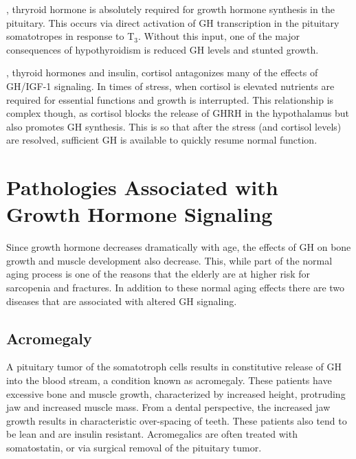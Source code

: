 \documentclass{tufte-handout}
\begin{document}
, thryroid hormone is absolutely required for growth hormone synthesis in the pituitary.  This occurs via direct activation of GH transcription in the pituitary somatotropes in response to T$_3$.  Without this input, one of the major consequences of hypothyroidism is reduced GH levels and stunted growth.

, thyroid hormones and insulin, cortisol antagonizes many of the effects of GH/IGF-1 signaling.  In times of stress, when cortisol is elevated nutrients are required for essential functions and growth is interrupted.  This relationship is complex though, as cortisol blocks the release of GHRH in the hypothalamus but also promotes GH synthesis.  This is so that after the stress (and cortisol levels) are resolved, sufficient GH is available to quickly resume normal function.

\section{Pathologies Associated with Growth Hormone Signaling}

Since growth hormone decreases dramatically with age, the effects of GH on bone growth and muscle development also decrease.  This, while part of the normal aging process is one of the reasons that the elderly are at higher risk for sarcopenia and fractures.  In addition to these normal aging effects there are two diseases that are associated with altered GH signaling.  

\subsection{Acromegaly}

A pituitary tumor of the somatotroph cells results in constitutive release of GH into the blood stream, a condition known as acromegaly.  These patients have excessive bone and muscle growth, characterized by increased height, protruding jaw and increased muscle mass.  From a dental perspective, the increased jaw growth results in characteristic over-spacing of teeth.  These patients also tend to be lean and are insulin resistant.  Acromegalics are often treated with somatostatin, or via surgical removal of the pituitary tumor.
\end{document}
